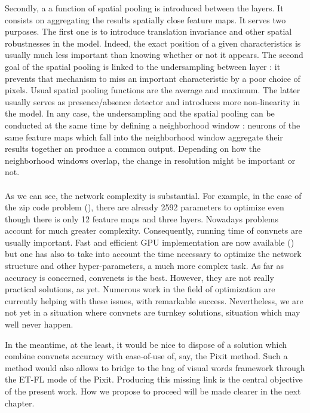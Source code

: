 \documentclass[a4paper]{report}
\begin{document}
\par
Secondly, a a function of spatial pooling is introduced between the layers. It consists on aggregating the results spatially close feature maps. It serves two purposes. The first one is to introduce translation invariance and other spatial robustnesses in the model. Indeed, the exact position of a given characteristics is usually much less important than knowing whether or not it appears. The second goal of the spatial pooling is linked to the undersampling between layer : it prevents that mechanism to miss an important characteristic by a poor choice of pixels. Usual spatial pooling functions are the average and maximum. The latter usually serves as presence/absence detector and introduces more non-linearity in the model. In any case, the undersampling and the spatial pooling can be conducted at the same time by defining a neighborhood window : neurons of the same feature maps which fall into the neighborhood window aggregate their results together an produce a common output. Depending on how the neighborhood windows overlap, the change in resolution might be important or not.


\paragraph{}
As we can see, the network complexity is substantial. For example, in the case of the zip code problem (\cite{ConvNet}), there are already 2592 parameters to optimize even though there is only 12 feature maps and three layers. Nowadays problems account for much greater complexity. Consequently, running time of convnets are usually important. Fast and efficient GPU implementation are now available (\cite{GPUConvnet}) but one has also to take into account the time necessary to optimize the network structure and other hyper-parameters, a much more complex task. As far as accuracy is concerned, convenets is the best. However, they are not really practical solutions, as yet. Numerous work in the field of optimization are currently helping with these issues, with remarkable success. Nevertheless, we are not yet in a situation where convnets are turnkey solutions, situation which may well never happen. 
\par
In the meantime, at the least, it would be nice to dispose of a solution which combine convnets accuracy with ease-of-use of, say, the Pixit method. Such a method would also allows to bridge to the bag of visual words framework through the ET-FL mode of the Pixit. Producing this missing link is the central objective of the present work. How we propose to proceed will be made clearer in the next chapter.
\end{document}
